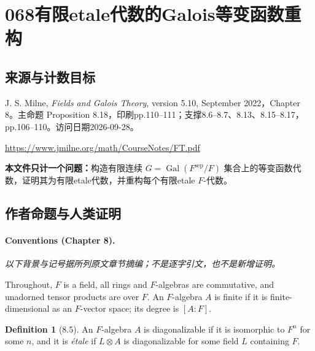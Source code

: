 \documentclass[UTF8,11pt]{ctexart}
\theoremstyle{definition}
\newtheorem*{definition}{Definition}
\begin{document}
\section*{068\quad 有限etale代数的Galois等变函数重构}
\subsection*{来源与计数目标}
J. S. Milne, \emph{Fields and Galois Theory}, version 5.10, September 2022，Chapter 8。主命题 Proposition 8.18，印刷pp.110--111；支撑8.6--8.7、8.13、8.15--8.17，pp.106--110。访问日期2026-09-28。
\par\url{https://www.jmilne.org/math/CourseNotes/FT.pdf}
\par\textbf{本文件只计一个问题：}构造有限连续 $G=\operatorname{Gal}(F^{\mathrm{sep}}/F)$ 集合上的等变函数代数，证明其为有限etale代数，并重构每个有限etale $F$-代数。
\subsection*{作者命题与人类证明}
\paragraph{Conventions (Chapter 8).}
\noindent\textit{以下背景与记号据所列原文章节摘编；不是逐字引文，也不是新增证明。}\par
Throughout, $F$ is a field, all rings and $F$-algebras are commutative, and unadorned tensor products are over $F$. An $F$-algebra $A$ is finite if it is finite-dimensional as an $F$-vector space; its degree is $[A:F]$.
\begin{definition}[8.5]
An $F$-algebra $A$ is diagonalizable if it is isomorphic to $F^n$ for some $n$, and it is \emph{\'etale} if $L\otimes A$ is diagonalizable for some field $L$ containing $F$.
\end{definition}
\end{document}

